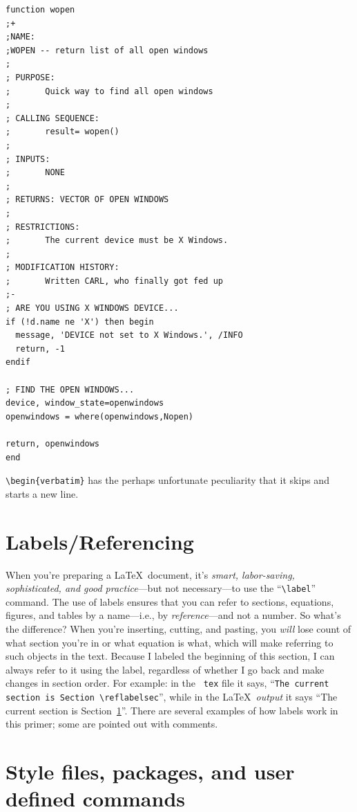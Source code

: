 \documentclass[preprint]{aastex}
\begin{document}
\begin{verbatim}
function wopen
;+
;NAME:
;WOPEN -- return list of all open windows
;
; PURPOSE:
;       Quick way to find all open windows
;
; CALLING SEQUENCE:
;       result= wopen()
;
; INPUTS:
;       NONE
;
; RETURNS: VECTOR OF OPEN WINDOWS
;
; RESTRICTIONS:
;       The current device must be X Windows.
;
; MODIFICATION HISTORY:
;       Written CARL, who finally got fed up
;-
; ARE YOU USING X WINDOWS DEVICE...
if (!d.name ne 'X') then begin
  message, 'DEVICE not set to X Windows.', /INFO
  return, -1
endif

; FIND THE OPEN WINDOWS...
device, window_state=openwindows
openwindows = where(openwindows,Nopen)

return, openwindows
end
\end{verbatim}

\noindent \verb$\begin{verbatim}$ has the perhaps unfortunate
peculiarity that it skips and starts a new line.

\section{Labels/Referencing}\label{labelsec}

When you're preparing a \LaTeX\ document, it's {\it smart, labor-saving,
sophisticated, and good practice}---but not necessary---to use the
``\verb&\label&'' command.  The use of labels ensures that you can refer
to sections, equations, figures, and tables by a name---i.e., by {\it
reference}---and not a number.  So what's the difference? When you're
inserting, cutting, and pasting, you {\it will} lose count of what
section you're in or what equation is what, which will make referring to
such objects in the text.  Because I labeled the beginning of this
section, I can always refer to it using the label, regardless of whether
I go back and make changes in section order.  For example: in the {\tt
tex} file it says, ``{\tt The current section is
Section~\verb$\$ref{labelsec}}'', while in the \LaTeX\ {\it output} it
says ``The current section is Section~\ref{labelsec}''.
There are several examples of how labels work in this primer; some are
pointed out with comments. 

\section{Style files, packages, and user defined commands}\label{stylesec}
\end{document}
